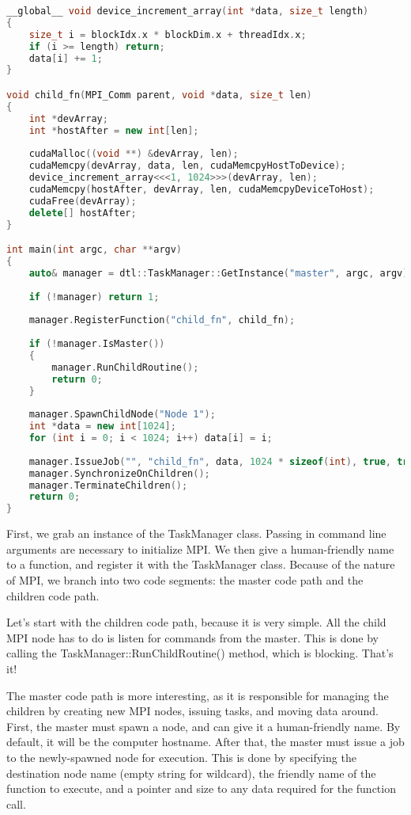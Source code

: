 \documentclass[11pt]{article}
\begin{document}
            \begin{lstlisting}[language=C++]
__global__ void device_increment_array(int *data, size_t length)
{
    size_t i = blockIdx.x * blockDim.x + threadIdx.x;
    if (i >= length) return;
    data[i] += 1;
}

void child_fn(MPI_Comm parent, void *data, size_t len)
{
    int *devArray;
    int *hostAfter = new int[len];
    
    cudaMalloc((void **) &devArray, len);
    cudaMemcpy(devArray, data, len, cudaMemcpyHostToDevice);
    device_increment_array<<<1, 1024>>>(devArray, len);
    cudaMemcpy(hostAfter, devArray, len, cudaMemcpyDeviceToHost);
    cudaFree(devArray);
    delete[] hostAfter;
}

int main(int argc, char **argv)
{
    auto& manager = dtl::TaskManager::GetInstance("master", argc, argv);
    
    if (!manager) return 1;
    
    manager.RegisterFunction("child_fn", child_fn);
    
    if (!manager.IsMaster())
    {
        manager.RunChildRoutine();
        return 0;
    }
    
    manager.SpawnChildNode("Node 1");
    int *data = new int[1024];
    for (int i = 0; i < 1024; i++) data[i] = i;
    
    manager.IssueJob("", "child_fn", data, 1024 * sizeof(int), true, true);
    manager.SynchronizeOnChildren();
    manager.TerminateChildren();
    return 0;
}
            \end{lstlisting}
    
            First, we grab an instance of the TaskManager class. Passing in command line arguments are 
            necessary to initialize MPI. We then give a human-friendly name to a function, and register
            it with the TaskManager class. Because of the nature of MPI, we branch into two code segments:
            the master code path and the children code path. 
            
            Let's start with the children code path, because it is very simple. All the child MPI node
            has to do is listen for commands from the master. This is done by calling the 
            TaskManager::RunChildRoutine() method, which is blocking. That's it!
            
            The master code path is more interesting, as it is responsible for managing the children by
            creating new MPI nodes, issuing tasks, and moving data around. First, the master must spawn
            a node, and can give it a human-friendly name. By default, it will be the computer hostname.
            After that, the master must issue a job to the newly-spawned node for execution. This is done
            by specifying the destination node name (empty string for wildcard), the friendly name of the
            function to execute, and a pointer and size to any data required for the function call. 
            
\end{document}
